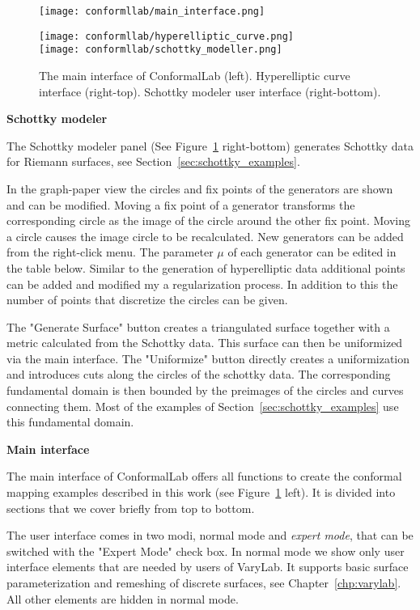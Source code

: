\documentclass[Thesis.tex]{subfiles}
\begin{document}
\begin{figure}
\centering
\texttt{[image: conformllab/main\_interface.png]}\hfill
\begin{minipage}[b]{0.5\linewidth}
\texttt{[image: conformllab/hyperelliptic\_curve.png]}\\
\vskip 0.1cm
\texttt{[image: conformllab/schottky\_modeller.png]}
\end{minipage}
\caption{The main interface of {\sc ConformalLab} (left). Hyperelliptic curve interface (right-top).
Schottky modeler user interface (right-bottom).}
\label{fig:conformal_main_generators}
\end{figure}

{\bf Schottky modeler}

The Schottky modeler panel (See Figure~\ref{fig:conformal_main_generators} right-bottom) generates Schottky data for Riemann surfaces, see Section~\ref{sec:schottky_examples}. 

In the graph-paper view the circles and fix points of the generators are shown and can be modified. 
Moving a fix point of a generator transforms the corresponding circle as the image of the circle around the other fix point. 
Moving a circle causes the image circle to be recalculated. 
New generators can be added from the right-click menu. 
The parameter $\mu$ of each generator can be edited in the table below.
Similar to the generation of hyperelliptic data additional points can be added and modified my a regularization process. 
In addition to this the number of points that discretize the circles can be given.

The "Generate Surface" button creates a triangulated surface together with a metric calculated from the Schottky data. 
This surface can then be uniformized via the main interface. 
The "Uniformize" button directly creates a uniformization and introduces cuts along the circles of the schottky data. 
The corresponding fundamental domain is then bounded by the preimages of the circles and curves connecting them.
Most of the examples of Section~\ref{sec:schottky_examples} use this fundamental domain.

{\bf Main interface}

The main interface of {\sc ConformalLab} offers all functions to create the conformal mapping examples described in this work (see Figure~\ref{fig:conformal_main_generators} left). 
It is divided into sections that we cover briefly from top to bottom. 

The user interface comes in two modi, normal mode and \emph{expert mode}, that can be switched with the "Expert Mode" check box. 
In normal mode we show only user interface elements that are needed by users of {\sc VaryLab}.
It supports basic surface parameterization and remeshing of discrete surfaces, see Chapter~\ref{chp:varylab}. 
All other elements are hidden in normal mode.
\end{document}
